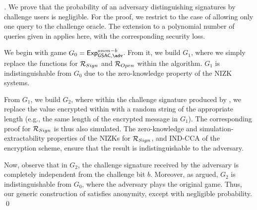 \begin{proof}[]
  We prove that the probability of an adversary distinguishing signatures by
  challenge users is negligible. For the proof, we restrict to the case of
  allowing only one query to the challenge oracle. The extension to a polynomial
  number of queries given in \cite{bsz05} applies here, with the corresponding
  security loss.

  We begin with game $G_0=\ExpGSACAnonb$. From it, we build $G_1$, where we
  simply replace the \NIZKSetup functions for $\mathcal{R}_{Sign}$ and
  $\mathcal{R}_{Open}$ within the \Setup algorithm. $G_1$ is indistinguishable
  from $G_0$ due to the zero-knowledge property of the NIZK systems.

  From $G_1$, we build $G_2$, where within the challenge signature produced by
  \CHALb, we replace the \Ccom value encrypted within \Sign with a random
  string of the appropriate length (e.g., the same length of the encrypted
  message in $G_1$). The corresponding proof for $\mathcal{R}_{Sign}$ is thus
  also simulated. The zero-knowledge and simulation-extractability properties
  of the NIZKs for $\mathcal{R}_{Sign}$, and IND-CCA of the encryption
  scheme, ensure that the result is indistinguishable to the adversary.

  Now, observe that in $G_2$, the challenge signature received by the adversary
  is completely independent from the challenge bit $b$. Moreover, as argued,
  $G_2$ is indistinguishable from $G_0$, where the adversary plays the original
  \ExpGSACAnonb game. Thus, our generic construction of \GSAC satisfies
  anonymity, except with negligible probability.
  \qed
\end{proof}

